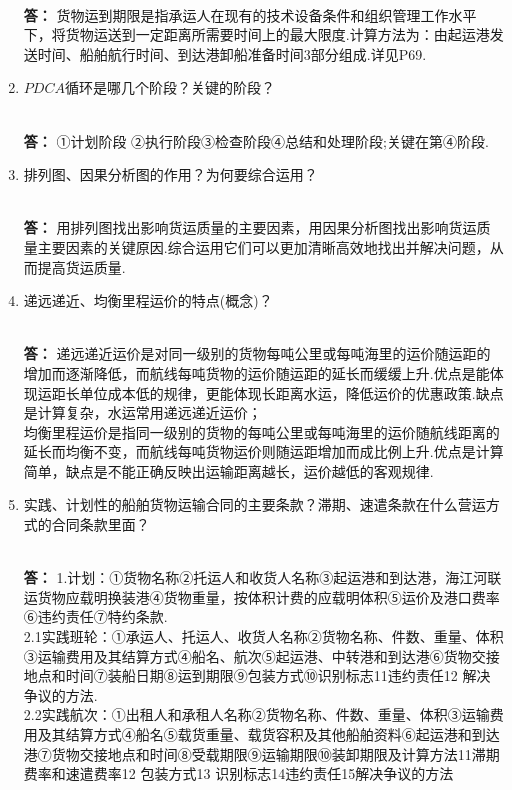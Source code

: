 \documentclass[UTF8]{ctexart}
\begin{document}
\begin{enumerate}[1]
\\ \textbf{答：} 货物运到期限是指承运人在现有的技术设备条件和组织管理工作水平下，将货物运送到一定距离所需要时间上的最大限度.计算方法为：由起运港发送时间、船舶航行时间、到达港卸船准备时间3部分组成.详见P69.
\item \begin{CJK}{UTF8}{you} $PDCA$循环是哪几个阶段？关键的阶段？\end{CJK}
\\ \textbf{答：}   ①计划阶段 ②执行阶段③检查阶段④总结和处理阶段;关键在第④阶段.
\item \begin{CJK}{UTF8}{you} 排列图、因果分析图的作用？为何要综合运用？\end{CJK}
\\ \textbf{答：} 用排列图找出影响货运质量的主要因素，用因果分析图找出影响货运质量主要因素的关键原因.综合运用它们可以更加清晰高效地找出并解决问题，从而提高货运质量.
\item \begin{CJK}{UTF8}{you} 递远递近、均衡里程运价的特点(概念)？\end{CJK}
\\ \textbf{答：} 递远递近运价是对同一级别的货物每吨公里或每吨海里的运价随运距的增加而逐渐降低，而航线每吨货物的运价随运距的延长而缓缓上升.优点是能体现运距长单位成本低的规律，更能体现长距离水运，降低运价的优惠政策.缺点是计算复杂，水运常用递远递近运价；
\\ 均衡里程运价是指同一级别的货物的每吨公里或每吨海里的运价随航线距离的延长而均衡不变，而航线每吨货物运价则随运距增加而成比例上升.优点是计算简单，缺点是不能正确反映出运输距离越长，运价越低的客观规律.
\item \begin{CJK}{UTF8}{you} 实践、计划性的船舶货物运输合同的主要条款？滞期、速遣条款在什么营运方式的合同条款里面？
\end{CJK}
\\ \textbf{答：} 1.计划：①货物名称②托运人和收货人名称③起运港和到达港，海江河联运货物应载明换装港④货物重量，按体积计费的应载明体积⑤运价及港口费率⑥违约责任⑦特约条款.
\\ 2.1实践班轮：①承运人、托运人、收货人名称②货物名称、件数、重量、体积③运输费用及其结算方式④船名、航次⑤起运港、中转港和到达港⑥货物交接地点和时间⑦装船日期⑧运到期限⑨包装方式⑩识别标志\textcircled{\footnotesize{11}}违约责任\textcircled{\footnotesize{12}} 解决争议的方法.
\\2.2实践航次：①出租人和承租人名称②货物名称、件数、重量、体积③运输费用及其结算方式④船名⑤载货重量、载货容积及其他船舶资料⑥起运港和到达港⑦货物交接地点和时间⑧受载期限⑨运输期限⑩装卸期限及计算方法\textcircled{\footnotesize{11}}滞期费率和速遣费率\textcircled{\footnotesize{12}} 包装方式\textcircled{\footnotesize{13}} 识别标志\textcircled{\footnotesize{14}}违约责任\textcircled{\footnotesize{15}}解决争议的方法

\end{enumerate}
\end{document}

